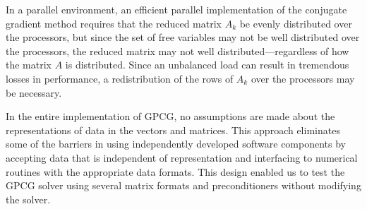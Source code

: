 In a parallel environment,
an efficient parallel implementation of the conjugate gradient method
requires that the reduced matrix $A_k$ 
be evenly distributed over the processors,
but since the set of free variables may not be well distributed over the
processors, the reduced matrix may not well distributed---regardless of
how the matrix $A$ is distributed.
Since an unbalanced load can result in tremendous losses in
performance, a redistribution of the rows of $A_k$ over the processors
may be necessary.

In the entire implementation of GPCG, no assumptions are made about
the representations of data in the vectors and matrices.  This
approach eliminates some of the barriers in using independently
developed software components by accepting data that is independent of
representation and interfacing to numerical routines with the appropriate
data formats.  This design enabled us to test the GPCG solver
using several matrix formats and preconditioners without modifying the
solver.


